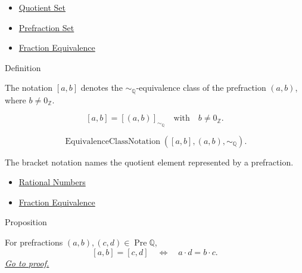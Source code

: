 \begin{dependencies}
\begin{itemize}
  \item \hyperref[def:quotient-set]{Quotient Set}
  \item \hyperref[def:prefraction-set]{Prefraction Set}
  \item \hyperref[def:fraction-equivalence]{Fraction Equivalence}
\end{itemize}
\end{dependencies}

\begin{definitionbox}{Definition}
\begin{definition}
\label{def:rational-class-notation}
The notation $[a,b]$ denotes the $\sim_{\mathbb{Q}}$-equivalence class of the
prefraction $(a,b)$, where $b\ne 0_{\mathbb{Z}}$.
\end{definition}
\end{definitionbox}

\begin{remark*}
\[
[a,b]=[(a,b)]_{\sim_{\mathbb{Q}}}
\quad\text{with}\quad b\ne0_{\mathbb{Z}}.
\]
\end{remark*}

\begin{remark*}
\[
\operatorname{EquivalenceClassNotation}([a,b],(a,b),\sim_{\mathbb{Q}}).
\]
\end{remark*}

\begin{remark*}[Interpretation]
The bracket notation names the quotient element represented by a prefraction.
\end{remark*}

\begin{dependencies}
\begin{itemize}
  \item \hyperref[def:rationals]{Rational Numbers}
  \item \hyperref[def:fraction-equivalence]{Fraction Equivalence}
\end{itemize}
\end{dependencies}

\begin{propositionbox}{Proposition}
\begin{proposition}
\label{prop:equality-criterion-for-rational-classes}
For prefractions $(a,b),(c,d)\in\operatorname{Pre}\mathbb{Q}$,
\[
[a,b]=[c,d]
\quad\Longleftrightarrow\quad
a\cdot d=b\cdot c.
\]
\hyperref[prf:equality-criterion-for-rational-classes]{\textit{Go to proof.}}
\end{proposition}
\end{propositionbox}

